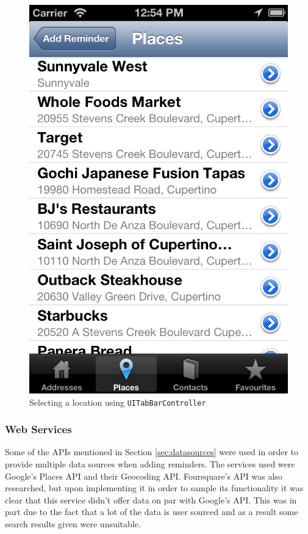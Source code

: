 \documentclass[12pt]{report}
\begin{document}
\begin{figure}[H]
\centering
\includegraphics[scale=0.2]{images/location-tabbar}
\caption{Selecting a location using \texttt{UITabBarController}}
\label{fig:locationtabbar}
\end{figure}

\subsubsection{Web Services}

Some of the APIs mentioned in Section \ref{sec:datasources} were used in order to provide multiple data sources when adding reminders. The services used were Google's Places API and their Geocoding API. Foursquare's API was also researched, but upon implementing it in order to sample its functionality it was clear that this service didn't offer data on par with Google's API. This was in part due to the fact that a lot of the data is user sourced and as a result some search results given were unsuitable.\\
\end{document}
